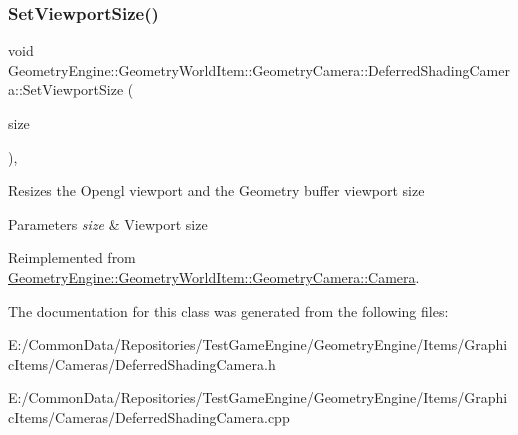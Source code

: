 \subsubsection{\texorpdfstring{SetViewportSize()}{SetViewportSize()}}
{\footnotesize\ttfamily void Geometry\+Engine\+::\+Geometry\+World\+Item\+::\+Geometry\+Camera\+::\+Deferred\+Shading\+Camera\+::\+Set\+Viewport\+Size (\begin{DoxyParamCaption}\item[{const Q\+Vector4D \&}]{size }\end{DoxyParamCaption})\hspace{0.3cm}{\ttfamily [override]}, {\ttfamily [virtual]}}

Resizes the Opengl viewport and the Geometry buffer viewport size 
\begin{DoxyParams}{Parameters}
{\em size} & Viewport size \\
\hline
\end{DoxyParams}


Reimplemented from \mbox{\hyperlink{class_geometry_engine_1_1_geometry_world_item_1_1_geometry_camera_1_1_camera_a96954629a05eba955adc1dff2df1fbdb}{Geometry\+Engine\+::\+Geometry\+World\+Item\+::\+Geometry\+Camera\+::\+Camera}}.



The documentation for this class was generated from the following files\+:\begin{DoxyCompactItemize}
\item 
E\+:/\+Common\+Data/\+Repositories/\+Test\+Game\+Engine/\+Geometry\+Engine/\+Items/\+Graphic\+Items/\+Cameras/Deferred\+Shading\+Camera.\+h\item 
E\+:/\+Common\+Data/\+Repositories/\+Test\+Game\+Engine/\+Geometry\+Engine/\+Items/\+Graphic\+Items/\+Cameras/Deferred\+Shading\+Camera.\+cpp\end{DoxyCompactItemize}
